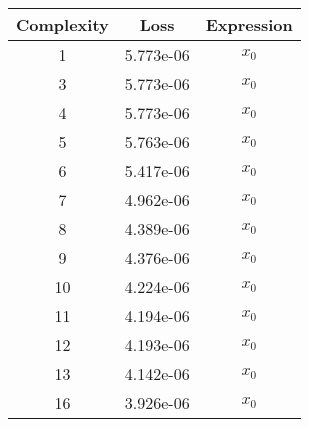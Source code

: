 \begin{center}
        \begin{tabular}{|c|c|c|}
        \hline
        Complexity & Loss & Expression \\
        \hline
        1 & 5.773e-06 & $\begin{aligned}x_{0}\end{aligned}$\\ \hline3 & 5.773e-06 & $\begin{aligned}x_{0}\end{aligned}$\\ \hline4 & 5.773e-06 & $\begin{aligned}x_{0}\end{aligned}$\\ \hline5 & 5.763e-06 & $\begin{aligned}x_{0}\end{aligned}$\\ \hline6 & 5.417e-06 & $\begin{aligned}x_{0}\end{aligned}$\\ \hline7 & 4.962e-06 & $\begin{aligned}x_{0}\end{aligned}$\\ \hline8 & 4.389e-06 & $\begin{aligned}x_{0}\end{aligned}$\\ \hline9 & 4.376e-06 & $\begin{aligned}x_{0}\end{aligned}$\\ \hline10 & 4.224e-06 & $\begin{aligned}x_{0}\end{aligned}$\\ \hline11 & 4.194e-06 & $\begin{aligned}x_{0}\end{aligned}$\\ \hline12 & 4.193e-06 & $\begin{aligned}x_{0}\end{aligned}$\\ \hline13 & 4.142e-06 & $\begin{aligned}x_{0}\end{aligned}$\\ \hline16 & 3.926e-06 & $\begin{aligned}x_{0}\end{aligned}$\\ \hline\end{tabular}
        \end{center}
        